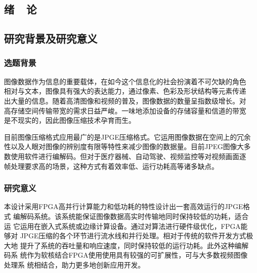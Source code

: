 \documentclass{article}
\numberwithin {equation}{section}
\begin{document}
\newpage
\tableofcontents

\newpage
\setcounter{page}{1}

\begin{spacing}{1.25} %
\section{绪\ \ 论}
  \subsection{研究背景及研究意义}
  \subsubsection{选题背景}
    \vspace{1em}
    图像数据作为信息的重要载体，在如今这个信息化的社会扮演着不可欠缺的角色
    相对与文本，图像具有强大的表达能力，通过像素、色彩及形状结构等元素传递
    出大量的信息。随着高清图像和视频的普及，图像数据的数量呈指数级增长。对
    高存储空间传输带宽的需求日益严峻。一味地添加设备的存储容量和信道的带宽
    是不现实的，因此图像压缩技术孕育而生。

    目前图像压缩格式应用最广的是JPGE压缩格式。它运用图像数据在空间上的冗余
    性以及人眼对图像的辨别度有限等特性来减少图像的数据量。目前JPEG图像大多
    数使用软件进行编解码。但对于医疗器械、自动驾驶、视频监控等对视频画面逐
    帧处理要求高的场景，这种方式有着效率低、运行功耗高等诸多缺点。
  \subsubsection{研究意义}
    \vspace{1em}
    本设计采用FPGA高并行计算能力和低功耗的特性设计出一套高效运行的JPGE格式
    编解码系统。该系统能保证图像数据高实时传输地同时保持较低的功耗，适合运
    它运用在嵌入式系统或边缘计算设备。通过对算法进行硬件级优化，FPGA能够对
    JPGE压缩的各个环节进行流水线和并行处理。相对于传统的软件开发方式极大地
    提升了系统的吞吐量和响应速度，同时保持较低的运行功耗。此外这种编解码系
    统作为软核结合FPGA使用使用具有较强的可扩展性，可与大多数视频图像处理系
    统相结合，助力更多地创新应用开发。

\end{spacing}
\end{document}
